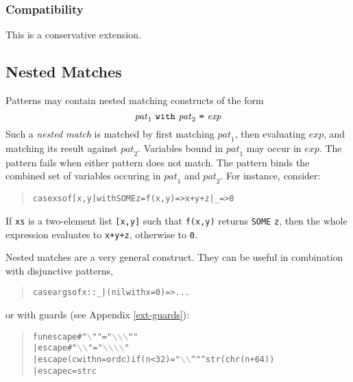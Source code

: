 \documentclass[twoside,titlepage]{article}
\begin{document}
\begin{appendix}
\subsubsection*{Compatibility}

This is a conservative extension. 


\subsection{Nested Matches}
\label{ext-nestedpatterns}

Patterns may contain nested matching constructs of the form
$$
\mathit{pat}_1~{\tt{with}}~\mathit{pat}_2~\mbox{\tt=}~\mathit{exp}
$$
Such a \emph{nested match} is matched by first matching $\mathit{pat}_1$, then evaluating $\mathit{exp}$, and matching its result against $\mathit{pat}_2$. Variables bound in $\mathit{pat}_1$ may occur in $\mathit{exp}$. The pattern fails when either pattern does not match. The pattern binds the combined set of variables occuring in $\mathit{pat}_1$ and $\mathit{pat}_2$. For instance, consider:
\begin{quote}
\begin{alltt}
case xs of [x,y] with SOME z = f(x,y) => x+y+z | _ => 0
\end{alltt}
\end{quote}
If {\tt xs} is a two-element list {\tt[x,y]} such that {\tt f(x,y)} returns {\tt SOME} {\tt z}, then the whole expression evaluates to {\tt x+y+z}, otherwise to {\tt0}.

Nested matches are a very general construct. They can be useful in combination with disjunctive patterns,
\begin{quote}
\begin{alltt}
case args of x::_ | (nil with x = 0) => ...
\end{alltt}
\end{quote}
or with guards (see Appendix \ref{ext-guards}):
\begin{quote}
\begin{alltt}
fun escape #"\(\backslash\)"" = "\(\backslash\)\(\backslash\)\(\backslash\)""
  | escape #"\(\backslash\)\(\backslash\)" = "\(\backslash\)\(\backslash\)\(\backslash\)\(\backslash\)"
  | escape (c with n=ord c) if (n < 32) = "\(\backslash\)\(\backslash\)^" ^ str(chr(n+64))
  | escape c = str c
\end{alltt}
\end{quote}


\end{appendix}
\end{document}
